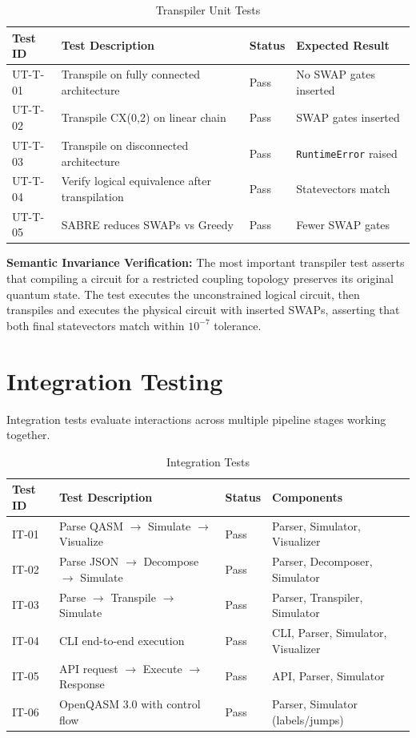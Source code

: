 \begin{table}[h!]
\centering
\caption{Transpiler Unit Tests}
\label{tab:trans_tests}
\begin{tabular}{|p{2cm}|p{5cm}|p{2cm}|p{3.5cm}|}
\hline
\textbf{Test ID} & \textbf{Test Description} & \textbf{Status} & \textbf{Expected Result} \\
\hline
UT-T-01 & Transpile on fully connected architecture & Pass & No SWAP gates inserted \\
\hline
UT-T-02 & Transpile CX(0,2) on linear chain & Pass & SWAP gates inserted \\
\hline
UT-T-03 & Transpile on disconnected architecture & Pass & \texttt{RuntimeError} raised \\
\hline
UT-T-04 & Verify logical equivalence after transpilation & Pass & Statevectors match \\
\hline
UT-T-05 & SABRE reduces SWAPs vs Greedy & Pass & Fewer SWAP gates \\
\hline
\end{tabular}
\end{table}

\textbf{Semantic Invariance Verification:} The most important transpiler test asserts that compiling a circuit for a restricted coupling topology preserves its original quantum state. The test executes the unconstrained logical circuit, then transpiles and executes the physical circuit with inserted SWAPs, asserting that both final statevectors match within $10^{-7}$ tolerance.

\section{Integration Testing}
Integration tests evaluate interactions across multiple pipeline stages working together.

\begin{table}[h!]
\centering
\caption{Integration Tests}
\label{tab:integration_tests}
\begin{tabular}{|p{2cm}|p{6cm}|p{2cm}|p{2.5cm}|}
\hline
\textbf{Test ID} & \textbf{Test Description} & \textbf{Status} & \textbf{Components} \\
\hline
IT-01 & Parse QASM $\to$ Simulate $\to$ Visualize & Pass & Parser, Simulator, Visualizer \\
\hline
IT-02 & Parse JSON $\to$ Decompose $\to$ Simulate & Pass & Parser, Decomposer, Simulator \\
\hline
IT-03 & Parse $\to$ Transpile $\to$ Simulate & Pass & Parser, Transpiler, Simulator \\
\hline
IT-04 & CLI end-to-end execution & Pass & CLI, Parser, Simulator, Visualizer \\
\hline
IT-05 & API request $\to$ Execute $\to$ Response & Pass & API, Parser, Simulator \\
\hline
IT-06 & OpenQASM 3.0 with control flow & Pass & Parser, Simulator (labels/jumps) \\
\hline
\end{tabular}
\end{table}

